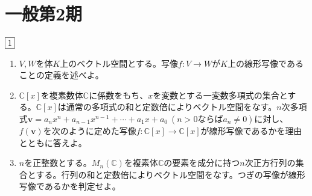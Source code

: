 \documentclass[dvipdfmx]{jsreport}
\newcommand{\C}{\mathbb{C}}
\DeclareMathOperator{\Tr}{Tr}
\newcounter{num}[section]
\begin{document}
\section{一般第2期}
\begin{tcolorbox} %
	$\fbox{1}$
\begin{enumerate}
	\item $V, W$を体$K$上のベクトル空間とする。写像$f\colon V\to W$が$K$上の線形写像であることの定義を述べよ。
	\item $\C[x]$を複素数体$\C$に係数をもち、$x$を変数とする一変数多項式の集合とする。$\C[x]$は通常の多項式の和と定数倍によりベクトル空間をなす。$n$次多項式$\bm{v}= a_n x^n+ a_{n- 1}x^{n- 1}+ \cdots+ a_1 x+ a_0\ (n> 0ならばa_n\ne 0)$に対し、$f(\bm{v})$を次のように定めた写像$f\colon \C[x]\to \C[x]$が線形写像であるかを理由とともに答えよ。
	\item $n$を正整数とする。$M_n(\C)$を複素体$\C$の要素を成分に持つ$n$次正方行列の集合とする。行列の和と定数倍によりベクトル空間をなす。つぎの写像が線形写像であるかを判定せよ。
\end{enumerate}
\end{tcolorbox}
\end{document}
